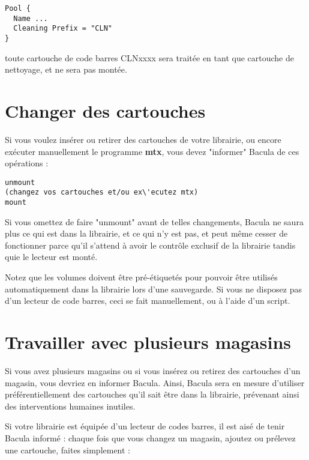 \footnotesize
\begin{verbatim}
Pool {
  Name ...
  Cleaning Prefix = "CLN"
}
\end{verbatim}
\normalsize

toute cartouche de code barres  CLNxxxx sera trait\'ee en tant que cartouche de 
nettoyage, et ne sera pas mont\'ee.

\section{Changer des cartouches}
Si vous voulez ins\'erer ou retirer des cartouches de votre librairie, ou encore 
ex\'ecuter manuellement le programme {\bf mtx}, vous devez "informer" Bacula de ces op\'erations :

\footnotesize
\begin{verbatim}
unmount
(changez vos cartouches et/ou ex\'ecutez mtx)
mount
\end{verbatim}
\normalsize

Si vous omettez de faire "unmount" avant de telles changements, Bacula ne saura plus 
ce qui est dans la librairie, et ce qui n'y est pas, et peut m\^eme cesser de fonctionner 
parce qu'il s'attend \`a avoir le contr\^ole exclusif de la librairie tandis quie le lecteur 
est mont\'e.

Notez que les volumes doivent \^etre pr\'e-\'etiquet\'es pour pouvoir \^etre utilis\'es 
automatiquement dans la librairie lors d'une sauvegarde. Si vous ne disposez 
pas d'un lecteur de code barres, ceci se fait manuellement, ou \`a l'aide d'un 
script.

\label{Magazines}
\section{Travailler avec plusieurs magasins}

Si vous avez plusieurs magasins ou si vous ins\'erez ou retirez des 
cartouches d'un magasin, vous devriez en informer Bacula. Ainsi, Bacula 
sera en mesure d'utiliser pr\'ef\'erentiellement des cartouches qu'il sait \^etre 
dans la librairie, pr\'evenant ainsi des interventions humaines inutiles.

Si votre librairie est \'equip\'ee d'un lecteur de codes barres, il est ais\'e 
de tenir Bacula inform\'e : chaque fois que vous changez un magasin, ajoutez 
ou pr\'elevez une cartouche, faites simplement : 

